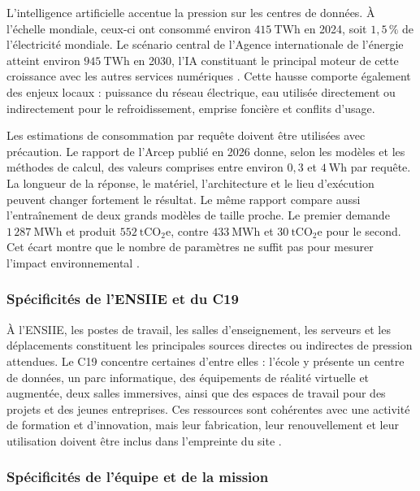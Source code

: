 L'intelligence artificielle accentue la pression sur les centres de données.
À l'échelle mondiale, ceux-ci ont consommé environ $415~\mathrm{TWh}$ en 2024,
soit $1{,}5\,\%$ de l'électricité mondiale. Le scénario central de l'Agence
internationale de l'énergie atteint environ $945~\mathrm{TWh}$ en 2030, l'IA
constituant le principal moteur de cette croissance avec les autres services
numériques \cite{aieEnergyAI2025}. Cette hausse comporte également des enjeux
locaux : puissance du réseau électrique, eau utilisée directement ou
indirectement pour le refroidissement, emprise foncière et conflits d'usage.

Les estimations de consommation par requête doivent être utilisées avec
précaution. Le rapport de l'Arcep publié en 2026 donne, selon les modèles et les
méthodes de calcul, des valeurs comprises entre environ $0{,}3$ et
$4~\mathrm{Wh}$ par requête. La longueur de la réponse, le matériel,
l'architecture et le lieu d'exécution peuvent changer fortement le résultat.
Le même rapport compare aussi l'entraînement de deux grands modèles de taille
proche. Le premier demande $1\,287~\mathrm{MWh}$ et produit
$552~\mathrm{tCO_2e}$, contre $433~\mathrm{MWh}$ et $30~\mathrm{tCO_2e}$ pour
le second. Cet écart montre que le nombre de paramètres ne suffit pas pour
mesurer l'impact environnemental \cite{arcepIAEnvironnement2026}.

\subsubsection{Spécificités de l'ENSIIE et du C19}

À l'ENSIIE, les postes de travail, les salles d'enseignement, les serveurs et
les déplacements constituent les principales sources directes ou indirectes
de pression attendues. Le C19 concentre certaines d'entre elles : l'école y
présente un centre de données, un parc informatique, des équipements de
réalité virtuelle et augmentée, deux salles immersives, ainsi que des espaces
de travail pour des projets et des jeunes entreprises. Ces ressources sont
cohérentes avec une activité de formation et d'innovation, mais leur
fabrication, leur renouvellement et leur utilisation doivent être inclus dans
l'empreinte du site \cite{ensiieC19}.

\subsubsection{Spécificités de l'équipe et de la mission}

